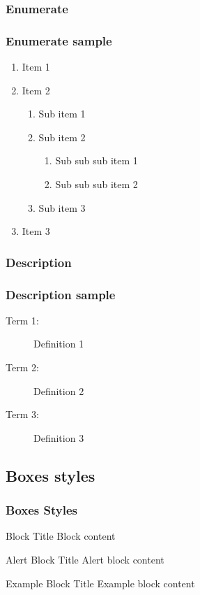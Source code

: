 \documentclass[aspectratio=169]{beamer}
\begin{document}
\subsubsection{Enumerate}

\begin{frame}[label=enumerate]\frametitle{Enumerate sample} 
	\begin{enumerate}
		\item Item 1
		\item Item 2
		\begin{enumerate}
			\item Sub item 1
			\item Sub item 2
			\begin{enumerate}
				\item Sub sub sub item 1
				\item Sub sub sub item 2
			\end{enumerate}
			\item Sub item 3
		\end{enumerate}
		\item Item 3
	\end{enumerate}
\end{frame}

\subsubsection{Description}

\begin{frame}[label=description]\frametitle{Description sample}
    
\begin{description}
	\item[Term 1:] Definition 1
	\item[Term 2:] Definition 2
	\item[Term 3:] Definition 3
\end{description}

\end{frame}

\subsection{Boxes styles}

\begin{frame}[label=boxes]\frametitle{Boxes Styles}
    
\begin{block}{Block Title}
	Block content
\end{block}

\begin{alertblock}{Alert Block Title}
	Alert block content
\end{alertblock}

\begin{exampleblock}{Example Block Title}
	Example block content
\end{exampleblock}

\end{frame}
\end{document}
